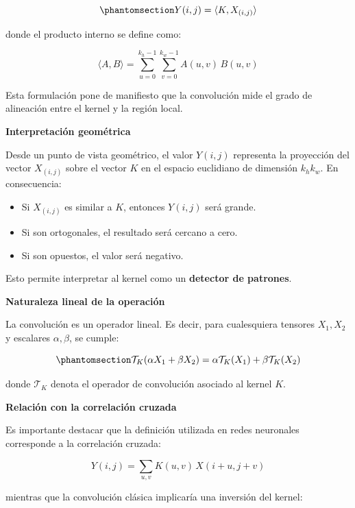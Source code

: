 \documentclass[
  spanish,
  us-letterpaper,
]{scrreprt}
\providecommand{\tightlist}{%
  \setlength{\itemsep}{0pt}\setlength{\parskip}{0pt}}
\theoremstyle{definition}
\theoremstyle{remark}
\begin{document}
\begin{equation}\phantomsection\label{eq-producto-interno-conv}{
Y(i,j) = \langle K, X_{(i,j)} \rangle
}\end{equation}

donde el producto interno se define como:

\[
\langle A, B \rangle = \sum_{u=0}^{k_h-1} \sum_{v=0}^{k_w-1} A(u,v)\, B(u,v)
\]

Esta formulación pone de manifiesto que la convolución mide el grado de
alineación entre el kernel y la región local.

\textbf{Interpretación geométrica}

Desde un punto de vista geométrico, el valor \(Y(i,j)\) representa la
proyección del vector \(X_{(i,j)}\) sobre el vector \(K\) en el espacio
euclidiano de dimensión \(k_h k_w\). En consecuencia:

\begin{itemize}
\tightlist
\item
  Si \(X_{(i,j)}\) es similar a \(K\), entonces \(Y(i,j)\) será grande.
\item
  Si son ortogonales, el resultado será cercano a cero.
\item
  Si son opuestos, el valor será negativo.
\end{itemize}

Esto permite interpretar al kernel como un \textbf{detector de
patrones}.

\textbf{Naturaleza lineal de la operación}

La convolución es un operador lineal. Es decir, para cualesquiera
tensores \(X_1, X_2\) y escalares \(\alpha, \beta\), se cumple:

\begin{equation}\phantomsection\label{eq-linealidad}{
\mathcal{T}_K(\alpha X_1 + \beta X_2)
= \alpha \mathcal{T}_K(X_1) + \beta \mathcal{T}_K(X_2)
}\end{equation}

donde \(\mathcal{T}_K\) denota el operador de convolución asociado al
kernel \(K\).

\textbf{Relación con la correlación cruzada}

Es importante destacar que la definición utilizada en redes neuronales
corresponde a la correlación cruzada:

\[
Y(i,j) =
\sum_{u,v} K(u,v)\, X(i+u, j+v)
\]

mientras que la convolución clásica implicaría una inversión del kernel:
\end{document}
